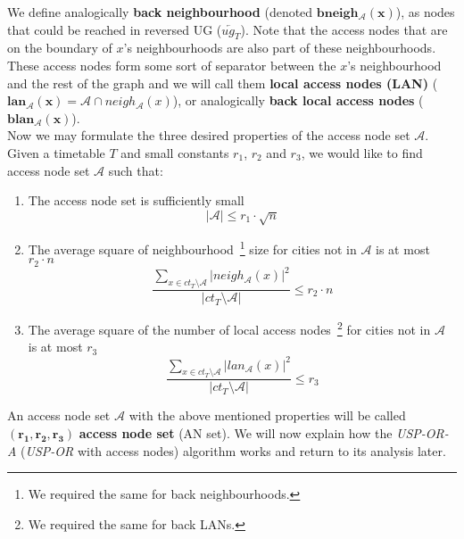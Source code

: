     \noindent We define analogically \textbf{back neighbourhood} (denoted $\bm{bneigh_{\mathcal{A}}(x)}$), as nodes that could be reached in reversed UG ($\overleftarrow{ug_{T}}$). Note that the access nodes that are on the boundary of $x$'s neighbourhoods are also part of these neighbourhoods. These access nodes form some sort of separator between the $x$'s neighbourhood and the rest of the graph and we will call them \textbf{local access nodes (LAN)} ($\bm{lan_{\mathcal{A}}(x)} = \mathcal{A} \cap neigh_{\mathcal{A}}(x)$), or analogically \textbf{back local access nodes} ($\bm{blan_{\mathcal{A}}(x)}$). \\
    
    \noindent Now we may formulate the three desired properties of the access node set $\mathcal{A}$. Given a timetable $T$ and small constants $r_{1}$, $r_{2}$ and $r_{3}$, we would like to find access node set $\mathcal{A}$ such that:
    \begin{enumerate}
		\item The access node set is sufficiently small \\
		\begin{equation} \label{eq:r1}
			|\mathcal{A}| \leq r_{1} \cdot \sqrt{n}
		\end{equation}
		\item The average square of neighbourhood~\footnote{We required the same for back neighbourhoods.} size for cities not in $\mathcal{A}$ is at most $r_{2} \cdot n$ \\
		\begin{equation} \label{eq:r2}
			\frac{\displaystyle \sum_{x \in ct_{T} \setminus \mathcal{A}}|neigh_{\mathcal{A}}(x)|^{2}}{\displaystyle |ct_{T} \setminus \mathcal{A}|} \leq r_{2} \cdot n
		\end{equation}
		\item The average square of the number of local access nodes~\footnote{We required the same for back LANs.} for cities not in $\mathcal{A}$ is at most $r_{3}$ \\
		\begin{equation} \label{eq:r3}
			\frac{\displaystyle \sum_{x \in ct_{T} \setminus \mathcal{A}}|lan_{\mathcal{A}}(x)|^{2}}{\displaystyle |ct_{T} \setminus \mathcal{A}|} \leq r_{3}
		\end{equation}
	\end{enumerate}
	\hspace{\fill}
	
	\noindent An access node set $\mathcal{A}$ with the above mentioned properties will be called $\bm{(r_{1}, r_{2}, r_{3})}$ \textbf{access node set} (AN set). We will now explain how the \textit{USP-OR-A} (\textit{USP-OR} with access nodes) algorithm works and return to its analysis later. 
	
